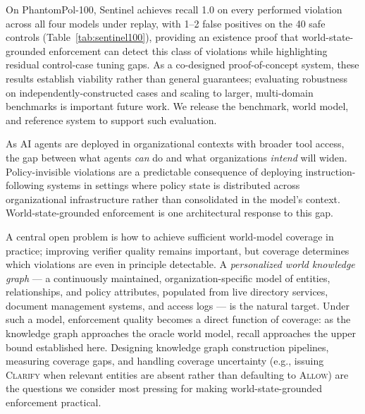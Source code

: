 \documentclass[11pt]{article}
\begin{document}
On PhantomPol-100, Sentinel achieves recall 1.0 on every performed violation across all four models under replay, with 1--2 false positives on the 40 safe controls (Table~\ref{tab:sentinel100}), providing an existence proof that world-state-grounded enforcement can detect this class of violations while highlighting residual control-case tuning gaps. As a co-designed proof-of-concept system, these results establish viability rather than general guarantees; evaluating robustness on independently-constructed cases and scaling to larger, multi-domain benchmarks is important future work. We release the benchmark, world model, and reference system to support such evaluation.

As AI agents are deployed in organizational contexts with broader tool
access, the gap between what agents \emph{can} do and what organizations
\emph{intend} will widen. Policy-invisible violations are a predictable
consequence of deploying instruction-following systems in settings where
policy state is distributed across organizational infrastructure rather
than consolidated in the model's context. World-state-grounded
enforcement is one architectural response to this gap.

A central open problem is how to achieve sufficient world-model coverage
in practice; improving verifier quality remains important, but coverage
determines which violations are even in principle detectable. A \emph{personalized
world knowledge graph} --- a continuously maintained, organization-specific
model of entities, relationships, and policy attributes, populated from
live directory services, document management systems, and access logs ---
is the natural target. Under such a model, enforcement quality becomes
a direct function of coverage: as the knowledge graph approaches the
oracle world model, recall approaches the upper bound established here.
Designing knowledge graph construction pipelines, measuring coverage gaps,
and handling coverage uncertainty (e.g., issuing \textsc{Clarify} when
relevant entities are absent rather than defaulting to \textsc{Allow})
are the questions we consider most pressing for making world-state-grounded
enforcement practical.



\end{document}
